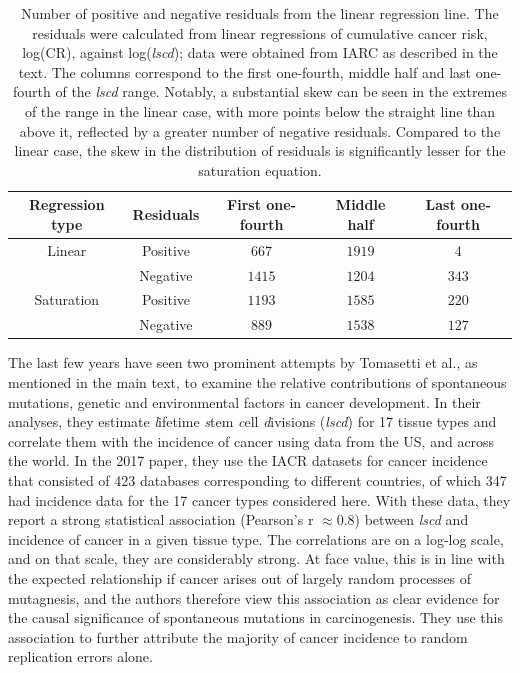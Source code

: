 \documentclass[10pt,twocolumn,twoside]{article}
\begin{document}
		\begin{table}[tbhp]
			\centering
			\begin{tabular}[c]{ccccc}
				\textbf{Regression type} & \textbf{Residuals} & \textbf{First one-fourth} & \textbf{Middle half} & \textbf{Last one-fourth} \\
				\hline
				Linear & Positive & $667$ & $1919$ & $4$ \\
			  	& Negative & $1415$ & $1204$ & $343$ \\
				Saturation & Positive & $1193$ & $1585$ & $220$ \\
			 	& Negative & $889$ & $1538$ & $127$ \\
			 	\hline
			\end{tabular}
			\caption{Number of positive and negative residuals from the linear regression line. The residuals were calculated from linear regressions of cumulative cancer risk, log(CR), against log(\textit{lscd}); data were obtained from IARC as described in the text. The columns correspond to the first one-fourth, middle half and last one-fourth of the \textit{lscd} range. Notably, a substantial skew can be seen in the extremes of the range in the linear case, with more points below the straight line than above it, reflected by a greater number of negative residuals. Compared to the linear case, the skew in the distribution of residuals is significantly lesser for the saturation equation.}
			\label{Table S3.2}
		\end{table}

		The last few years have seen two prominent attempts by Tomasetti et al., as mentioned in the main text, to examine the relative contributions of spontaneous mutations, genetic and environmental factors in cancer development.  In their analyses, they estimate \textit{l}ifetime \textit{s}tem \textit{c}ell \textit{d}ivisions (\textit{lscd}) for 17 tissue types and correlate them with the incidence of cancer using data from the US, and across the world. In the 2017 paper, they use the IACR datasets for cancer incidence that consisted of 423 databases corresponding to different countries, of which 347 had incidence data for the 17 cancer types considered here. With these data, they report a strong statistical association (Pearson’s r $\approx 0.8$) between \textit{lscd} and incidence of cancer in a given tissue type. The correlations are on a log-log scale, and on that scale, they are considerably strong. At face value, this is in line with the expected relationship if cancer arises out of largely random processes of mutagnesis, and the authors therefore view this association as clear evidence for the causal significance of spontaneous mutations in carcinogenesis. They use this association to further attribute the majority of cancer incidence to random replication errors alone.
\end{document}

